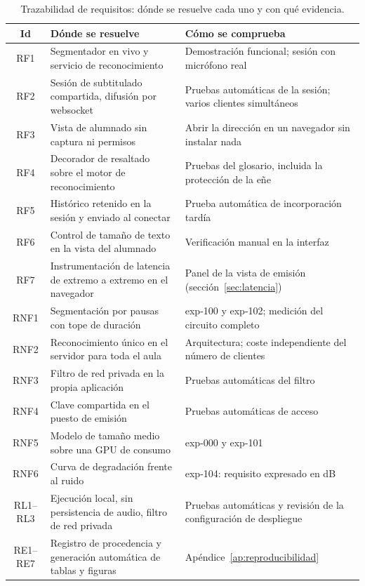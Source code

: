 \begin{table}[h]
\centering
\footnotesize
\setlength{\tabcolsep}{4pt}
\begin{tabular}{|c|p{5.3cm}|p{5.3cm}|}
\hline
\textbf{Id} & \textbf{Dónde se resuelve} & \textbf{Cómo se comprueba} \\
\hline
RF1 & Segmentador en vivo y servicio de reconocimiento & Demostración funcional; sesión con
      micrófono real \\
\hline
RF2 & Sesión de subtitulado compartida, difusión por websocket & Pruebas automáticas de la
      sesión; varios clientes simultáneos \\
\hline
RF3 & Vista de alumnado sin captura ni permisos & Abrir la dirección en un navegador sin
      instalar nada \\
\hline
RF4 & Decorador de resaltado sobre el motor de reconocimiento & Pruebas del glosario,
      incluida la protección de la eñe \\
\hline
RF5 & Histórico retenido en la sesión y enviado al conectar & Prueba automática de
      incorporación tardía \\
\hline
RF6 & Control de tamaño de texto en la vista del alumnado & Verificación manual en la
      interfaz \\
\hline
RF7 & Instrumentación de latencia de extremo a extremo en el navegador & Panel de la vista
      de emisión (sección~\ref{sec:latencia}) \\
\hline
RNF1 & Segmentación por pausas con tope de duración & exp-100 y exp-102; medición del
       circuito completo \\
\hline
RNF2 & Reconocimiento único en el servidor para toda el aula & Arquitectura; coste
       independiente del número de clientes \\
\hline
RNF3 & Filtro de red privada en la propia aplicación & Pruebas automáticas del filtro \\
\hline
RNF4 & Clave compartida en el puesto de emisión & Pruebas automáticas de acceso \\
\hline
RNF5 & Modelo de tamaño medio sobre una GPU de consumo & exp-000 y exp-101 \\
\hline
RNF6 & Curva de degradación frente al ruido & exp-104: requisito expresado en dB \\
\hline
RL1--RL3 & Ejecución local, sin persistencia de audio, filtro de red privada & Pruebas
       automáticas y revisión de la configuración de despliegue \\
\hline
RE1--RE7 & Registro de procedencia y generación automática de tablas y figuras &
       Apéndice~\ref{ap:reproducibilidad} \\
\hline
\end{tabular}
\caption{Trazabilidad de requisitos: dónde se resuelve cada uno y con qué evidencia.}
\label{tab:trazabilidad}
\end{table}
